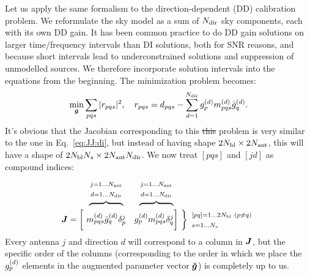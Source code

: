 \documentclass[useAMS,usenatbib]{mn2e}
\makeatletter
\newcommand{\mat}[1]{{\bmath{#1}}}
\newcommand{\JJ}{\mat{J}} %
\newcommand{\Stack}[1]{\begin{array}{@{}c@{}}#1\end{array}}
\newcommand{\AUG}[1]{\bmath{\breve{#1}}}
\newcommand{\Gg}{\AUG{g}}
\numberwithin{equation}{section}
\providecommand{\DIFdel}[1]{{\protect\color{red}\sout{#1}}}                      %
\providecommand{\DIFaddbegin}{} %
\providecommand{\DIFaddend}{} %
\providecommand{\DIFdelbegin}{} %
\providecommand{\DIFdelend}{} %
\makeatother
\begin{document}
Let us apply the same formalism to the direction-dependent (DD) calibration problem. 
We reformulate the sky model as a sum of $N_\mathrm{dir}$ sky components, each with its own DD 
gain. It has been common practice to do DD gain solutions on larger time/frequency intervals than DI 
solutions, both for SNR reasons, and because short intervals lead to underconstrained solutions
and suppression of unmodelled sources. We therefore incorporate solution intervals into the
equations from the beginning. The minimization problem becomes:
\begin{equation}
\label{eq:cal:dd:unpol}
\min_{\bmath{g}}\sum_{pqs}|r_{pqs}|^2, ~~~
r_{pqs} = d_{pqs} - \sum_{d=1}^{\Nd} \ggd_p \mmd_{pqs} \ggdH_q.
\end{equation}
It's obvious that the Jacobian corresponding to this \DIFdelbegin \DIFdel{this }\DIFdelend problem is very similar to the one 
in Eq.~\ref{eq:JJ:di}, but instead of having shape $2N_\mathrm{bl}\times2N_\mathrm{ant}$, this will have a 
shape of $2N_\mathrm{bl}N_s\times 2N_\mathrm{ant}N_\mathrm{dir}$. We now treat $[pqs]$ and $[jd]$ as compound indices: 
\begin{equation}
\begin{array}{r@{~}cc@{~}cc}
 & \overbrace{~~~~~~~~~~~~}^{\Stack{\scriptstyle j=1\dots \Na\\\scriptstyle d=1\dots \Nd}} & 
   \overbrace{~~~~~~~~~~~~}^{\Stack{\scriptstyle j=1\dots \Na\\\scriptstyle d=1\dots \Nd}} \\
\JJ = \bigg [ &
  \mmd_{pqs}\ggdH_q \delta^j_p & 
  \ggd_p \mmd_{pqs}  \delta^j_q 
\bigg ] &
\DIFdelbegin %
\DIFdelend \DIFaddbegin \bm{\bigg \}}
\DIFaddend \begin{array}{l}
\scriptstyle [pq]=1\dots 2\Nbl~(p\ne q)\\ \scriptstyle s=1\dots\Ns
\end{array}
\end{array}
\end{equation}
Every antenna $j$ and direction $d$ will correspond to a column in $\JJ$, but the specific order of the columns 
(corresponding to the order in which we place the $g^{(d)}_p$ elements in the augmented parameter vector $\Gg$)
is completely up to us. 
\end{document}
